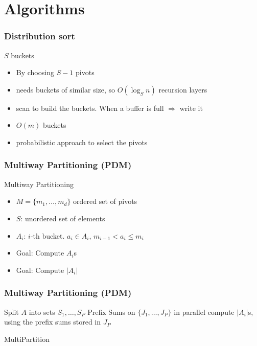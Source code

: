 \documentclass[12pt,aspectratio=169]{beamer}
\begin{document}
\section{Algorithms}

\begin{frame}\frametitle{Distribution sort}
  \begin{block}{$S$ buckets}
    \begin{itemize}
    \item
      By choosing $S-1$ pivots
    \item
      needs buckets of similar size, so $O(\log_{S}n)$ recursion layers
    \item
      scan to build the buckets.
%
      When a buffer is full $\Rightarrow$ write it
    \item
      $O(m)$ buckets
    \item
      probabilistic approach to select the pivots
    \end{itemize}
  \end{block}
\end{frame}


  \begin{frame}\frametitle{Multiway Partitioning (PDM)}
  \begin{block}{Multiway Partitioning}
    \begin{itemize}
    \item
      $M=\{ m_{1}, \ldots , m_{d}\}$ ordered set of pivots
    \item
      $S$: unordered set of elements
    \item
      $A_{i}$: $i$-th bucket. $a_{i}\in A_{i}$, $m_{i-1}< a_{i} \le m_{i}$
    \item
      Goal: Compute $A_{i}$s
    \item
      Goal: Compute $|A_{i}|$
    \end{itemize}
  \end{block}
\end{frame}

\begin{frame}\frametitle{Multiway Partitioning (PDM)}
  \begin{algorithm}[H]
    Split $A$ into sets $S_{1}, \ldots , S_{P}$\;
    Prefix Sums on $\{J_{1}, \ldots , J_{P}\}$ in parallel\;
    compute $|A_{i}|$s, using the prefix sums stored in $J_{P}$
    \caption{MultiPartition}
  \end{algorithm}
\end{frame}
\end{document}
